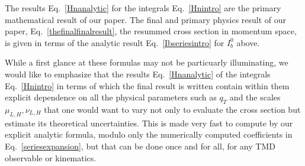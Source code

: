 \documentclass[a4,letterpaper,11pt]{article}
\newcommand{\eq}[1]{Eq.~\eqref{#1}}
\begin{document}
The results \eq{Hnanalytic} for the integrals \eq{Hnintro} are the primary mathematical result of our paper. The final and primary physics result of our paper, \eq{thefinalfinalresult}, the resummed cross section in momentum space, is given in terms of the analytic result \eq{Ibseriesintro} for $I_b^0$ above.

While a first glance at these formulas may not be particuarly illuminating, we would like to emphasize that the results \eq{Hnanalytic} of the integrals \eq{Hnintro} in terms of which the final result is written contain within them explicit dependence on all the physical parameters such as $q_T$ and the scales $\mu_{L,H},\nu_{L,H}$ that one would want to vary not only to evaluate the cross section but estimate its theoretical uncertainties. This is made very fast to compute by our explicit analytic formula, modulo only the numerically computed coefficients in \eq{seriesexpansion}, but that can be done once and for all, for any TMD observable or kinematics.
\end{document}
